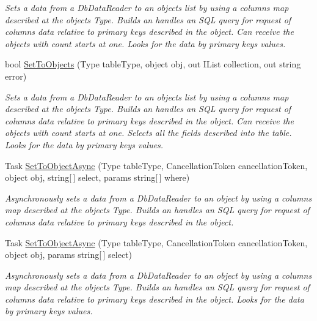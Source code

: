 \begin{DoxyCompactItemize}
\begin{DoxyCompactList}\small\item\em Sets a data from a Db\+Data\+Reader to an objects list by using a columns map described at the object\textquotesingle{}s Type. Builds an handles an S\+QL query for request of columns data relative to primary keys described in the object. Can receive the objects with count starts at one. Looks for the data by primary keys values. \end{DoxyCompactList}\item 
bool \mbox{\hyperlink{interface_uniform_data_operator_1_1_sql_1_1_i_sql_operator_a6bde25bff76c7b2105aa4e14740eb07d}{Set\+To\+Objects}} (Type table\+Type, object obj, out I\+List collection, out string error)
\begin{DoxyCompactList}\small\item\em Sets a data from a Db\+Data\+Reader to an objects list by using a columns map described at the object\textquotesingle{}s Type. Builds an handles an S\+QL query for request of columns data relative to primary keys described in the object. Can receive the objects with count starts at one. Selects all the fields described into the table. Looks for the data by primary keys values. \end{DoxyCompactList}\item 
Task \mbox{\hyperlink{interface_uniform_data_operator_1_1_sql_1_1_i_sql_operator_a16e1513f43f3b9d76c687ba3b026573d}{Set\+To\+Object\+Async}} (Type table\+Type, Cancellation\+Token cancellation\+Token, object obj, string\mbox{[}$\,$\mbox{]} select, params string\mbox{[}$\,$\mbox{]} where)
\begin{DoxyCompactList}\small\item\em Asynchronously sets a data from a Db\+Data\+Reader to an object by using a columns map described at the object\textquotesingle{}s Type. Builds an handles an S\+QL query for request of columns data relative to primary keys described in the object. \end{DoxyCompactList}\item 
Task \mbox{\hyperlink{interface_uniform_data_operator_1_1_sql_1_1_i_sql_operator_a3a973b49f190dabe6bcd0bf3e79b3c5e}{Set\+To\+Object\+Async}} (Type table\+Type, Cancellation\+Token cancellation\+Token, object obj, params string\mbox{[}$\,$\mbox{]} select)
\begin{DoxyCompactList}\small\item\em Asynchronously sets a data from a Db\+Data\+Reader to an object by using a columns map described at the object\textquotesingle{}s Type. Builds an handles an S\+QL query for request of columns data relative to primary keys described in the object. Looks for the data by primary keys values. \end{DoxyCompactList}\item 

\end{DoxyCompactItemize}
